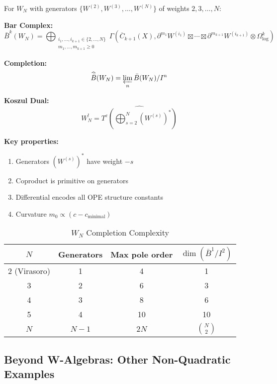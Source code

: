 \begin{construction}
\label{const:wn-general}

For $W_N$ with generators $\{W^{(2)}, W^{(3)}, \ldots, W^{(N)}\}$ of weights $2, 3, \ldots, N$:

\medskip
\noindent\textbf{Bar Complex:}
$$\bar{B}^k(W_N) = \bigoplus_{\substack{i_1,\ldots,i_{k+1} \in \{2,\ldots,N\} \\ m_1,\ldots,m_{k+1} \geq 0}} \Gamma\left(\overline{C}_{k+1}(X), \partial^{m_1} W^{(i_1)} \boxtimes \cdots \boxtimes \partial^{m_{k+1}} W^{(i_{k+1})} \otimes \Omega^k_{\log}\right)$$

\medskip
\noindent\textbf{Completion:}
$$\widehat{\bar{B}}(W_N) = \varprojlim_n \bar{B}(W_N)/I^n$$

\medskip
\noindent\textbf{Koszul Dual:}
$$W_N^! = \widehat{T^c\left(\bigoplus_{s=2}^N (W^{(s)})^*\right)}$$

\textbf{Key properties:}
\begin{enumerate}
\item Generators $(W^{(s)})^*$ have weight $-s$
\item Coproduct is primitive on generators
\item Differential encodes all OPE structure constants
\item Curvature $m_0 \propto (c - c_{\text{minimal}})$
\end{enumerate}
\end{construction}

\begin{table}[h]
\centering
\caption{$W_N$ Completion Complexity}
\begin{tabular}{|c|c|c|c|}
\hline
$N$ & Generators & Max pole order & $\dim(\bar{B}^1/I^2)$ \\
\hline
2 (Virasoro) & 1 & 4 & 1 \\
3 & 2 & 6 & 3 \\
4 & 3 & 8 & 6 \\
5 & 4 & 10 & 10 \\
$N$ & $N-1$ & $2N$ & $\binom{N}{2}$ \\
\hline
\end{tabular}
\end{table}


\subsection{Beyond W-Algebras: Other Non-Quadratic Examples}

